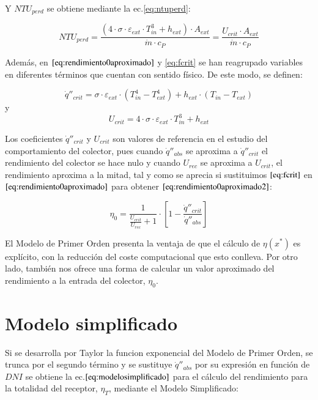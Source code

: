 Y $NTU_{perd}$ se obtiene mediante la ec.\eqref{eq:ntuperd}:

 \begin{equation}
    NTU_{perd} = \frac{\left(4 \cdot \sigma \cdot \varepsilon_{ext} \cdot T^3_{in}+h_{ext}\right) \cdot A_{ext}}{\dot m \cdot c_P} = \frac{U_{crit} \cdot A_{ext}}{\dot m \cdot c_P}
    \label{eq:ntuperd}
\end{equation}

Además, en $\eqref{eq:rendimiento0aproximado}$ y \eqref{eq:fcrit} se han reagrupado variables en diferentes términos que cuentan con sentido físico. De este modo, se definen:

\begin{equation}
    \dot q''_{crit} = \sigma \cdot \varepsilon_{ext} \cdot \left(T^{4}_{in}- T^{4}_{ext}\right)+h_{ext} \cdot \left(T_{in}- T_{ext}\right)
    \label{eq:qcrit}
\end{equation}
y
\begin{equation}
    U_{crit} = 4 \cdot \sigma \cdot \varepsilon_{ext} \cdot T^{3}_{in} + h_{ext}
    \label{eq:ucrit}
\end{equation}

Los coeficientes \(\dot q''_{crit}\) y \(U_{crit}\) son valores de referencia en el estudio del comportamiento del colector, pues cuando \(\dot q''_{abs}\) se aproxima a \(\dot q''_{crit}\) el rendimiento del colector se hace nulo y cuando \(U_{rec}\) se aproxima a \(U_{crit}\), el rendimiento aproxima a la mitad, tal y como se aprecia si sustituimos $\eqref{eq:fcrit}$ en $\eqref{eq:rendimiento0aproximado}$ para obtener $\eqref{eq:rendimiento0aproximado2}$:

\begin{equation}
    \eta_{0} = \frac{1}{\frac{U_{crit}}{U_{rec}}+1} \cdot \left[1-\frac{\dot q''_{crit}}{\dot q''_{abs}}\right] 
    \label{eq:rendimiento0aproximado2}
\end{equation}

El Modelo de Primer Orden presenta la ventaja de que el cálculo de \(\eta(x^{*})\) es explícito, con la reducción del coste computacional que esto conlleva. Por otro lado, también nos ofrece una forma de calcular un valor aproximado del rendimiento a la entrada del colector, \(\eta_{0}\).

\section{Modelo simplificado}
Si se desarrolla por Taylor la funcion exponencial del Modelo de Primer Orden, se trunca por el segundo término y se sustituye \(\dot q''_{abs}\) por su expresión en función de \(DNI\) se obtiene la ec.\(\eqref{eq:modelosimplificado}\) para el cálculo del rendimiento para la totalidad del receptor, $\eta_{T}$, mediante el Modelo Simplificado:

